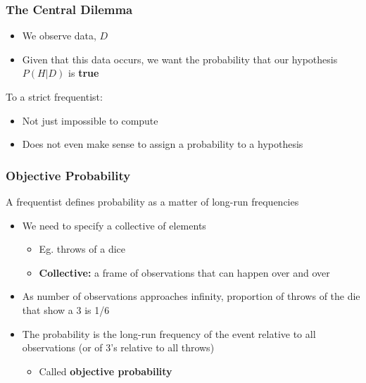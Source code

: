 \documentclass[12pt, block=fill]{beamer}
\begin{document}
\begin{frame}
  \frametitle{The Central Dilemma}
  \begin{itemize}
      \item We observe data, $D$
      \item Given that this data occurs, we want the probability that our hypothesis $P(H|D)$ is \textbf{true}
  \end{itemize}
  
  To a strict frequentist:

  \begin{itemize}
      \item Not just impossible to compute
      \item Does not even make sense to assign a probability to a hypothesis
  \end{itemize}
\end{frame}



\begin{frame}
  \frametitle{Objective Probability}
  A frequentist defines probability as a matter of long-run frequencies
  \begin{itemize}
    \item We need to specify a collective of elements
    \begin{itemize}
        \item Eg. throws of a dice
        \item \textbf{Collective:} a frame of observations that can happen over and over
    \end{itemize}
    \item As number of observations approaches infinity, proportion of throws of the die that show a 3 is 1/6
    \item The probability is the long-run frequency of the event relative to all observations (or of 3's relative to all throws)
    \begin{itemize}
        \item Called \textbf{objective probability}
    \end{itemize}
\end{itemize}
\end{frame}
\end{document}
